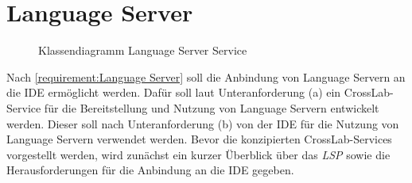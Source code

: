 \section{Language Server}\label{section:konzeption:language-server}


\begin{figure}[tbp]
    \centering
    \caption{Klassendiagramm Language Server Service}
    \label{figure:klassendiagramm-language-server-service}
\end{figure}

Nach \autoref{requirement:Language Server} soll die Anbindung von Language Servern an die IDE ermöglicht werden. Dafür soll laut Unteranforderung (a) ein CrossLab-Service für die Bereitstellung und Nutzung von Language Servern entwickelt werden. Dieser soll nach Unteranforderung (b) von der IDE für die Nutzung von Language Servern verwendet werden. Bevor die konzipierten CrossLab-Services vorgestellt werden, wird zunächst ein kurzer Überblick über das \textit{\ac{LSP}} \cite{noauthor_language-server-protocol_nodate} sowie die Herausforderungen für die Anbindung an die IDE gegeben.

